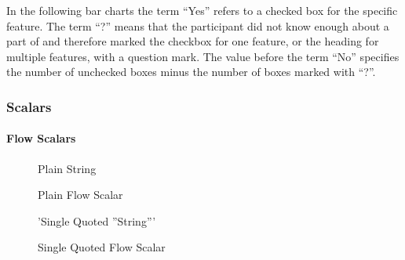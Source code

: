 In the following bar charts the term “Yes” refers to a checked box for the specific feature. The term “?” means that the participant did not know enough about a part of  and therefore marked the checkbox for one feature, or the heading for multiple features, with a question mark. The value before the term “No” specifies the number of unchecked boxes minus the number of boxes marked with “?”.

\subsubsection{Scalars}

\paragraph{Flow Scalars}

\begin{figure}[H]
  \begin{minipage}[t]{0.48\textwidth}
    \vspace{0pt}
    \begin{bchart}[max=9, width=0.85\textwidth]
    \end{bchart}
  \end{minipage}
  \begin{minipage}[t]{0.48\textwidth}
    \vspace{0pt}
    \begin{yamlcode}
      Plain String
    \end{yamlcode}
  \end{minipage}
  \caption{Plain Flow Scalar}
\end{figure}

\begin{figure}[H]
  \begin{minipage}[t]{0.48\textwidth}
    \vspace{0pt}
    \begin{bchart}[max=9, width=0.85\textwidth]
    \end{bchart}
  \end{minipage}
  \begin{minipage}[t]{0.48\textwidth}
    \vspace{0pt}
    \begin{yamlcode}
      'Single Quoted ''String'''
    \end{yamlcode}
  \end{minipage}
  \caption{Single Quoted Flow Scalar}
\end{figure}

